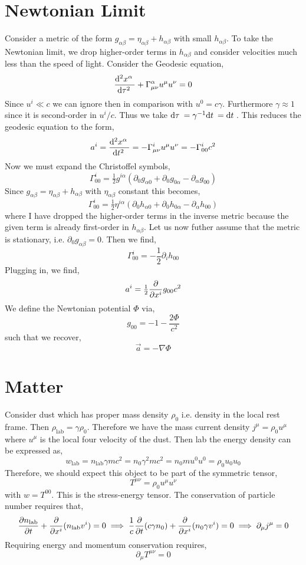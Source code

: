 \documentclass[11pt, a4paper]{article}
\begin{document}
\section{Newtonian Limit}

Consider a metric of the form $g_{\alpha \beta} = \eta_{\alpha \beta} + h_{\alpha \beta}$ with small $h_{\alpha \beta}$. To take the Newtonian limit, we drop higher-order terms in $h_{\alpha \beta}$ and consider velocities much less than the speed of light. Consider the Geodesic equation,
\begin{align*}
\frac{\mathrm{d}^{2} x^\alpha \:}{\mathrm{d}\tau^{2} \:} + \Gamma^\alpha_{\mu \nu} u^\mu u^\nu = 0 
\end{align*}
Since $u^i \ll c$ we can ignore then in comparison with $u^0 = c \gamma$. Furthermore $\gamma \approx 1$ since it is second-order in $u^i/c$. Thus we take $\mathrm{d}\tau \: = \gamma^{-1} \mathrm{d}t \: = \mathrm{d}t \:$. This reduces the geodesic equation to the form,
\[ a^i = \frac{\mathrm{d}^{2} x^\alpha \:}{\mathrm{d}t^{2} \:} = - \Gamma^i_{\mu \nu} u^\mu u^\nu = - \Gamma^i_{00} c^2 \]
Now we must expand the Christoffel symbols,
\[ \Gamma^i_{00} = \tfrac{1}{2} g^{i \alpha} \left( \partial_0 g_{\alpha 0} + \partial_0 g_{0 \alpha} - \partial_\alpha g_{00} \right) \]
Since $g_{\alpha \beta} = \eta_{\alpha \beta} + h_{\alpha \beta}$ with $\eta_{\alpha \beta}$ constant this becomes,
\[ \Gamma^i_{00} = \tfrac{1}{2} \eta^{i \alpha} \left( \partial_0 h_{\alpha 0} + \partial_0 h_{0 \alpha} - \partial_\alpha h_{00} \right) \]
where I have dropped the higher-order terms in the inverse metric because the given term is already first-order in $h_{\alpha \beta}$. Let us now futher assume that the metric is stationary, i.e. $\partial_0 g_{\alpha \beta} = 0$. Then we find,
\[ \Gamma^i_{00} = - \frac{1}{2} \partial_i h_{00} \]
Plugging in, we find,
\[ a^i = \tfrac{1}{2} \frac{\partial{}}{\partial{x^i}} g_{00} c^2 \]
We define the Newtonian potential $\Phi$ via,
\[ g_{00} = - 1 - \frac{2 \Phi}{c^2} \]
such that we recover,
\[ \vec{a} = - \nabla \Phi \]

\section{Matter}

Consider dust which has proper mass density $\rho_0$ i.e. density in the local rest frame. Then $\rho_{\text{lab}} = \gamma \rho_0$. Therefore we have the mass current density $j^\mu = \rho_0 u^\mu$ where $u^\mu$ is the local four velocity of the dust. Then lab the energy density can be expressed as,
\[ w_{\text{lab}} = n_{\text{lab}} \gamma m c^2 = n_0 \gamma^2 m c^2 = n_0 m u^0 u^0 = \rho_0 u_0 u _0 \]
Therefore, we should expect this object to be part of the symmetric tensor,
\[ T^{\mu \nu} = \rho_0 u^\mu u^\nu \]
with $w = T^{00}$. This is the stress-energy tensor. The conservation of particle number requires that,
\[ \frac{\partial{n_{\text{lab}}}}{\partial{t}} + \frac{\partial{}}{\partial{x^i}} (n_{\text{lab}} v^i) = 0 \implies \frac{1}{c} \frac{\partial{}}{\partial{t}} (c \gamma n_0) + \frac{\partial{}}{\partial{x^i}}(n_0 \gamma v^i) = 0 \implies \partial_\mu j^\mu = 0 \]
Requiring energy and momentum conservation requires,
\[ \partial_\mu T^{\mu \nu} = 0 \]
\end{document}
